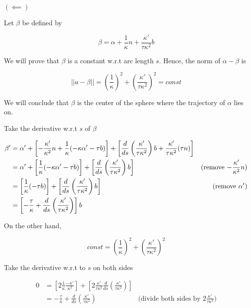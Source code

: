 \documentclass{article}
\begin{document}
$(\impliedby)$

Let $\beta$ be defined by

$$
    \beta = \alpha + \frac{1}{\kappa} n + \frac{\kappa'}{\tau \kappa^2} b
$$

We will prove that $\beta$ is a constant w.r.t arc length $s$. Hence, the norm of $\alpha - \beta$ is

$$
    ||a - \beta|| = \left(\frac{1}{\kappa}\right)^2 + \left(\frac{\kappa'}{\tau \kappa^2}\right)^2 = const
$$



We will conclude that $\beta$ is the center of the sphere where the trajectory of $\alpha$ lies on.

Take the derivative w.r.t $s$ of $\beta$

\begin{align*}
    \beta'
    &= \alpha' + \left[ - \frac{\kappa'}{\kappa^2} n + \frac{1}{\kappa} (-\kappa \alpha' - \tau b) \right] + \left[ \frac{d}{ds}\left( \frac{\kappa'}{\tau \kappa^2} \right) b + \frac{\kappa'}{\tau \kappa^2} (\tau n) \right] \\
    &= \alpha' + \left[\frac{1}{\kappa} (-\kappa \alpha' - \tau b) \right] + \left[ \frac{d}{ds}\left( \frac{\kappa'}{\tau \kappa^2} \right) b \right]  &\text{(remove $ - \frac{\kappa'}{\kappa^2} n$)}\\
    &= \left[\frac{1}{\kappa} (- \tau b) \right] + \left[ \frac{d}{ds}\left( \frac{\kappa'}{\tau \kappa^2} \right) b \right]  &\text{(remove $\alpha'$)}\\
    &= \left[ -\frac{\tau}{\kappa} + \frac{d}{ds}\left( \frac{\kappa'}{\tau \kappa^2} \right) \right] b \\
\end{align*}

On the other hand,

$$
    const = \left(\frac{1}{\kappa}\right)^2 + \left(\frac{\kappa'}{\tau \kappa^2}\right)^2
$$

Take the derivative w.r.t to $s$ on both sides

\begin{align*}
    0
    &= \left[ 2 \frac{1}{\kappa} \frac{-\kappa'}{\kappa^2} \right] + \left[2 \frac{\kappa'}{\tau \kappa^2} \frac{d}{ds} \left(\frac{\kappa'}{\tau \kappa^2}\right) \right] \\
    &= - \frac{\tau}{\kappa} + \frac{d}{ds} \left(\frac{\kappa'}{\tau \kappa^2}\right)  &\text{(divide both sides by $2 \frac{\kappa'}{\tau \kappa^2} $)}\\
\end{align*}
\end{document}
